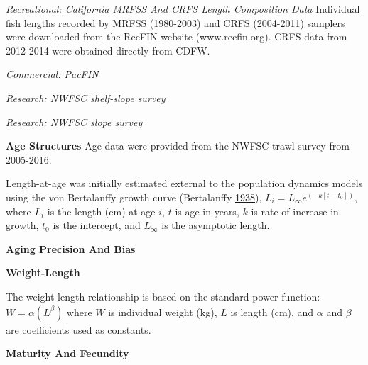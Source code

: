 \documentclass[12pt,]{article}
\begin{document}
\emph{Recreational: California MRFSS And CRFS Length Composition Data}
Individual fish lengths recorded by MRFSS (1980-2003) and CRFS
(2004-2011) samplers were downloaded from the RecFIN website
(www.recfin.org). CRFS data from 2012-2014 were obtained directly from
CDFW.

\emph{Commercial: PacFIN}

\emph{Research: NWFSC shelf-slope survey}

\emph{Research: NWFSC slope survey}

\vspace{.5cm}

\textbf{Age Structures} Age data were provided from the NWFSC trawl
survey from 2005-2016.

Length-at-age was initially estimated external to the population
dynamics models using the von Bertalanffy growth curve (Bertalanffy
\protect\hyperlink{ref-vonB1938}{1938}),
\(L_i = L_{\infty}e^{(-k[t-t_0])}\), where \(L_i\) is the length (cm) at
age \(i\), \(t\) is age in years, \(k\) is rate of increase in growth,
\(t_0\) is the intercept, and \(L_{\infty}\) is the asymptotic length.

\vspace{.5cm}

\textbf{Aging Precision And Bias}

\vspace{.5cm}

\textbf{Weight-Length}

The weight-length relationship is based on the standard power function:
\(W = \alpha(L^\beta)\) where \(W\) is individual weight (kg), \(L\) is
length (cm), and \(\alpha\) and \(\beta\) are coefficients used as
constants.

\vspace{.5cm}

\textbf{Maturity And Fecundity}

\vspace{.5cm}
\end{document}
